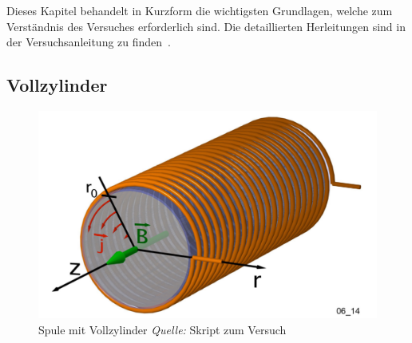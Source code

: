 Dieses Kapitel  behandelt in Kurzform  die wichtigsten Grundlagen,  welche zum
Verst\"andnis des Versuches erforderlich sind. Die detaillierten Herleitungen
sind in der Versuchsanleitung zu finden~\cite{ref:looser:skineffekt}.

%
%
%


\subsection{Vollzylinder}
\label{sec:arbgru:subsec:vollzylinder}

\begin{figure}[th!]
    \centering
    \includegraphics[width=.33\textwidth]{images/spule-vollzylinder.png}
    \caption{Spule mit Vollzylinder \emph{Quelle:} Skript zum Versuch~\cite{ref:looser:skineffekt}}
\end{figure}


